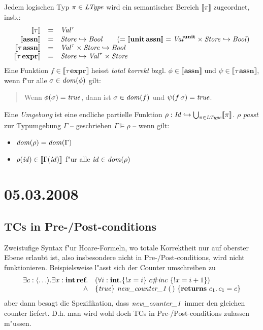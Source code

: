 \documentclass[12pt,a4paper,bigheadings]{scrartcl}
\newcommand{\semantic}[1]{\ensuremath{\llbracket#1\rrbracket}}
\newcommand{\assn}{\textbf{assn}}
\newcommand{\expr}{\textbf{expr}}
\begin{document}
Jedem logischen Typ $\pi \in {\text{\it LType\/}}$ wird ein semantischer Bereich $\semantic{\pi}$ zugeordnet,
insb.:
\[\begin{array}{rcl}
  \semantic{\tau} & = & \Val^\tau \\
  \semantic{\assn} & = & \Store \pto \Bool
                    \quad \quad (= \semantic{\unit\,\assn} = \Val^\unit \times \Store \pto \Bool) \\
  \semantic{\tau\,\assn} & = & \Val^\tau \times \Store \pto \Bool \\
  \semantic{\tau\,\expr} & = & \Store \pto \Val^\tau \times \Store
\end{array}\]
Eine Funktion $f \in \semantic{\tau\,\expr}$ heisst {\em total korrekt} bzgl. $\phi \in \semantic{\assn}$
und $\psi\in\semantic{\tau\,\assn}$, wenn f"ur alle $\sigma \in {\text{\it dom\/}}(\phi)$ gilt:
\begin{quote}
  Wenn $\phi(\sigma)={\text{\it true\/}}$, dann ist $\sigma\in{\text{\it dom\/}}(f)$ und $\psi(f\,\sigma) = {\text{\it true\/}}$.
\end{quote}
Eine {\em Umgebung} ist eine endliche partielle Funktion $\rho: \Id \pto \bigcup_{\pi\in\Ltype}\semantic{\pi}$.
$\rho$ {\em passt} zur Typumgebung $\Gamma$ -- geschrieben $\Gamma \models \rho$ -- wenn gilt:
\begin{itemize}
  \item ${\text{\it dom\/}}(\rho) = {\text{\it dom\/}}(\Gamma)$
  \item $\rho(\id) \in \semantic{\Gamma(\id)}$ f"ur alle ${\text{\it id\/}} \in {\text{\it dom\/}}(\rho)$
\end{itemize}


\section*{05.03.2008}

\subsection*{TCs in Pre-/Post-conditions}

Zweistufige Syntax f"ur Hoare-Formeln, wo totale Korrektheit nur auf oberster Ebene erlaubt ist,
also insbesondere nicht in Pre-/Post-conditions, wird nicht funktionieren. Beispielsweise l"asst
sich der Counter umschreiben zu
\[\begin{array}{rl}
  \exists c:\langle\ldots\rangle.\exists x:\reftype{\z}.
  & (\forall i:\z. \{!x=i\}\ c\#\name{inc}\ \{!x=i+1\}) \\
  \wedge & \{\true\}\ \name{new\_counter\_1}\,(\,)\ \{\ret{c_1}{c_1=c}\}
\end{array}\]
aber dann besagt die Spezifikation, dass ${\text{\it new\_counter\_1\/}}$ immer den gleichen counter
liefert. D.h. man wird wohl doch TCs in Pre-/Post-conditions zulassen m"ussen.
\end{document}
